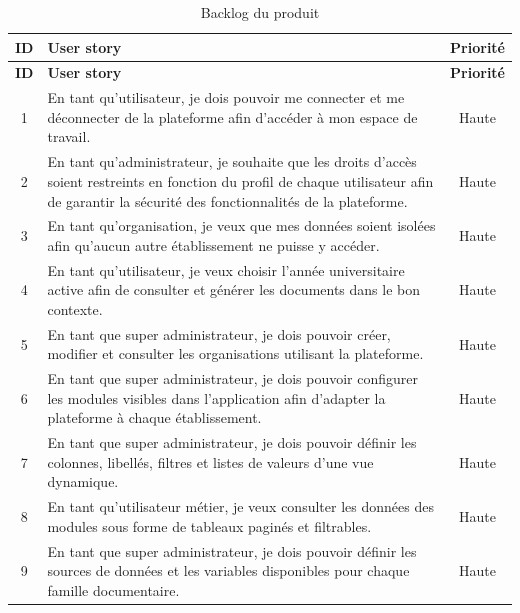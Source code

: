 \renewcommand{\arraystretch}{1.4}

\begin{longtable}{|c|m{11cm}|c|}
\caption{Backlog du produit}
\label{tab:product-backlog}
\\

\hline
\textbf{ID} & \textbf{User story} & \textbf{Priorité} \\
\hline
\endfirsthead

\hline
\textbf{ID} & \textbf{User story} & \textbf{Priorité} \\
\hline
\endhead

1 & En tant qu'utilisateur, je dois pouvoir me connecter et me déconnecter de la plateforme afin d'accéder à mon espace de travail. & Haute \\
\hline

2 & En tant qu'administrateur, je souhaite que les droits d’accès soient restreints en fonction du profil de chaque utilisateur afin de garantir la sécurité des fonctionnalités de la plateforme. & Haute \\
\hline

3 & En tant qu'organisation, je veux que mes données soient isolées afin qu'aucun autre établissement ne puisse y accéder. & Haute \\
\hline

4 & En tant qu'utilisateur, je veux choisir l'année universitaire active afin de consulter et générer les documents dans le bon contexte. & Haute \\
\hline

5 & En tant que super administrateur, je dois pouvoir créer, modifier et consulter les organisations utilisant la plateforme. & Haute \\
\hline

6 & En tant que super administrateur, je dois pouvoir configurer les modules visibles dans l'application afin d'adapter la plateforme à chaque établissement. & Haute \\
\hline

7 & En tant que super administrateur, je dois pouvoir définir les colonnes, libellés, filtres et listes de valeurs d'une vue dynamique. & Haute \\
\hline

8 & En tant qu'utilisateur métier, je veux consulter les données des modules sous forme de tableaux paginés et filtrables. & Haute \\
\hline

9 & En tant que super administrateur, je dois pouvoir définir les sources de données et les variables disponibles pour chaque famille documentaire. & Haute \\
\hline


\end{longtable}
